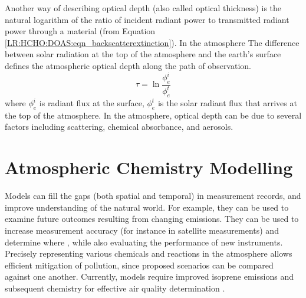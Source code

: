       Another way of describing optical depth (also called optical thickness) is the natural logarithm of the ratio of incident radiant power to transmitted radiant power through a material (from Equation \ref{LR:HCHO:DOAS:eqn_backscatterextinction}).
      In the atmosphere
      The difference between solar radiation at the top of the atmosphere and the earth's surface defines the atmospheric optical depth along the path of observation.
      \begin{equation}
      \tau = \ln{\frac{\phi_e^i}{\phi_e^t}}
      \end{equation}
      where $\phi_e^i$ is radiant flux at the surface, $\phi_e^t$ is the solar radiant flux that arrives at the top of the atmosphere.
      In the atmosphere, optical depth can be due to several factors including scattering, chemical absorbance, and aerosols.
  
\section{Atmospheric Chemistry Modelling}
\label{LR:Models}
  
  Models can fill the gaps (both spatial and temporal) in measurement records, and improve understanding of the natural world.
  For example, they can be used to examine future outcomes resulting from changing emissions.
  They can be used to increase measurement accuracy (for instance in satellite measurements) and determine where , while also evaluating the performance of new instruments.
  Precisely representing various chemicals and reactions in the atmosphere allows efficient mitigation of pollution, since proposed scenarios can be compared against one another.
  Currently, models require improved isoprene emissions and subsequent chemistry for effective air quality determination \parencite{Marvin2017}.
  
